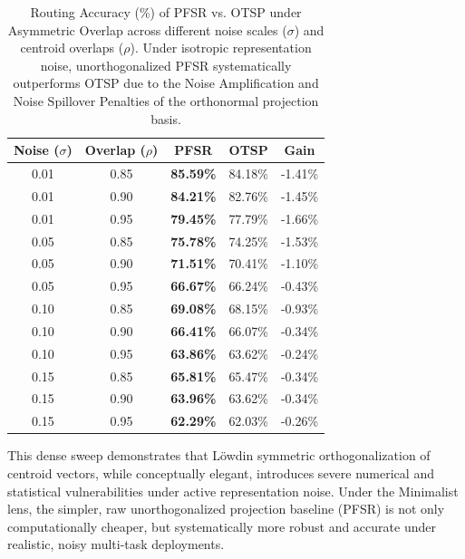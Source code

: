 \begin{table}[htbp]
\caption{Routing Accuracy (\%) of PFSR vs. OTSP under Asymmetric Overlap across different noise scales ($\sigma$) and centroid overlaps ($\rho$). Under isotropic representation noise, unorthogonalized PFSR systematically outperforms OTSP due to the Noise Amplification and Noise Spillover Penalties of the orthonormal projection basis.}
\label{tab:sweep_results}
\vskip 0.15in
\begin{center}
\begin{small}
\begin{sc}
\setlength{\tabcolsep}{3.5pt}
\begin{tabular}{ccccc}
\toprule
Noise ($\sigma$) & Overlap ($\rho$) & PFSR & OTSP & Gain \\
\midrule
0.01 & 0.85 & \textbf{85.59\%} & 84.18\% & -1.41\% \\
0.01 & 0.90 & \textbf{84.21\%} & 82.76\% & -1.45\% \\
0.01 & 0.95 & \textbf{79.45\%} & 77.79\% & -1.66\% \\
\midrule
0.05 & 0.85 & \textbf{75.78\%} & 74.25\% & -1.53\% \\
0.05 & 0.90 & \textbf{71.51\%} & 70.41\% & -1.10\% \\
0.05 & 0.95 & \textbf{66.67\%} & 66.24\% & -0.43\% \\
\midrule
0.10 & 0.85 & \textbf{69.08\%} & 68.15\% & -0.93\% \\
0.10 & 0.90 & \textbf{66.41\%} & 66.07\% & -0.34\% \\
0.10 & 0.95 & \textbf{63.86\%} & 63.62\% & -0.24\% \\
\midrule
0.15 & 0.85 & \textbf{65.81\%} & 65.47\% & -0.34\% \\
0.15 & 0.90 & \textbf{63.96\%} & 63.62\% & -0.34\% \\
0.15 & 0.95 & \textbf{62.29\%} & 62.03\% & -0.26\% \\
\bottomrule
\end{tabular}
\end{sc}
\end{small}
\end{center}
\vskip -0.1in
\end{table}

This dense sweep demonstrates that L{\"o}wdin symmetric orthogonalization of centroid vectors, while conceptually elegant, introduces severe numerical and statistical vulnerabilities under active representation noise. Under the Minimalist lens, the simpler, raw unorthogonalized projection baseline (PFSR) is not only computationally cheaper, but systematically more robust and accurate under realistic, noisy multi-task deployments.


